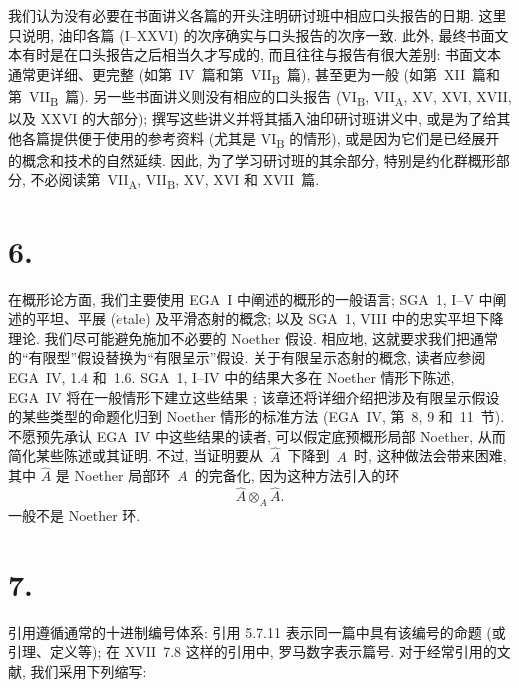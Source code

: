 我们认为没有必要在书面讲义各篇的开头注明研讨班中相应口头报告的日期.
这里只说明, 油印各篇 (I--XXVI) 的次序确实与口头报告的次序一致.
此外, 最终书面文本有时是在口头报告之后相当久才写成的, 而且往往与报告有很大差别:
书面文本通常更详细、更完整 (如第~IV~篇和第~VII\textsubscript{B}~篇),
甚至更为一般 (如第~XII~篇和第~VII\textsubscript{B}~篇).
另一些书面讲义则没有相应的口头报告
(VI\textsubscript{B}, VII\textsubscript{A}, XV, XVI, XVII, 以及 XXVI 的大部分);
撰写这些讲义并将其插入油印研讨班讲义中, 或是为了给其他各篇提供便于使用的参考资料
(尤其是 VI\textsubscript{B} 的情形), 或是因为它们是已经展开的概念和技术的自然延续.
因此, 为了学习研讨班的其余部分, 特别是约化群概形部分,
不必阅读第~VII\textsubscript{A}, VII\textsubscript{B}, XV, XVI 和 XVII~篇.

\section*{6.}

在概形论方面, 我们主要使用 EGA~I 中阐述的概形的一般语言;
SGA~1, I--V 中阐述的平坦、平展 (\(\acute{e}\)tale) 及平滑态射的概念;
以及 SGA~1, VIII 中的忠实平坦下降理论. 我们尽可能避免施加不必要的 Noether 假设.
相应地, 这就要求我们把通常的“有限型”假设替换为“有限呈示”假设.
关于有限呈示态射的概念, 读者应参阅 EGA~IV, 1.4 和~1.6.
SGA~1, I--IV 中的结果大多在 Noether 情形下陈述, EGA~IV 将在一般情形下建立这些结果
;
该章还将详细介绍把涉及有限呈示假设的某些类型的命题化归到 Noether 情形的标准方法
(EGA~IV, 第~8, 9 和~11~节). 不愿预先承认 EGA~IV 中这些结果的读者,
可以假定底预概形局部 Noether, 从而简化某些陈述或其证明.
不过, 当证明要从~$\widehat A$~下降到~$A$~时, 这种做法会带来困难,
其中 $\widehat A$ 是 Noether 局部环~$A$~的完备化, 因为这种方法引入的环
\[
  \widehat A\otimes_A\widehat A.
\]
一般不是 Noether 环.

\section*{7.}

引用遵循通常的十进制编号体系: 引用 5.7.11 表示同一篇中具有该编号的命题
(或引理、定义等); 在 XVII~7.8 这样的引用中, 罗马数字表示篇号.
对于经常引用的文献, 我们采用下列缩写:

